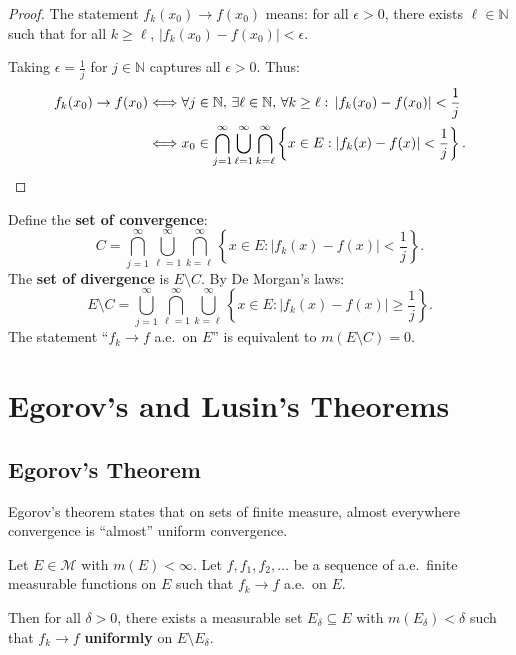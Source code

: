 \documentclass[11pt]{report}
\begin{document}
\begin{proof}
The statement $f_k(x_0) \to f(x_0)$ means: for all $\epsilon > 0$, there exists $\ell \in \mathbb{N}$ such that for all $k \geq \ell$, $|f_k(x_0) - f(x_0)| < \epsilon$.

Taking $\epsilon = \frac{1}{j}$ for $j \in \mathbb{N}$ captures all $\epsilon > 0$. Thus:
\begin{align*}
f_k(x_0) \to f(x_0) &\Longleftrightarrow \forall j \in \mathbb{N}, \, \exists \ell \in \mathbb{N}, \, \forall k \geq \ell: \, |f_k(x_0) - f(x_0)| < \frac{1}{j} \\
&\Longleftrightarrow x_0 \in \bigcap_{j=1}^{\infty} \bigcup_{\ell=1}^{\infty} \bigcap_{k=\ell}^{\infty} \left\{ x \in E : |f_k(x) - f(x)| < \frac{1}{j} \right\}. \qedhere
\end{align*}
\end{proof}

\begin{defbox}
Define the \textbf{set of convergence}:
\[
C = \bigcap_{j=1}^{\infty} \bigcup_{\ell=1}^{\infty} \bigcap_{k=\ell}^{\infty} \left\{ x \in E : |f_k(x) - f(x)| < \frac{1}{j} \right\}.
\]
The \textbf{set of divergence} is $E \setminus C$. By De Morgan's laws:
\[
E \setminus C = \bigcup_{j=1}^{\infty} \bigcap_{\ell=1}^{\infty} \bigcup_{k=\ell}^{\infty} \left\{ x \in E : |f_k(x) - f(x)| \geq \frac{1}{j} \right\}.
\]
The statement ``$f_k \to f$ a.e.\ on $E$'' is equivalent to $m(E \setminus C) = 0$.
\end{defbox}

\section{Egorov's and Lusin's Theorems}

\subsection{Egorov's Theorem}

Egorov's theorem states that on sets of finite measure, almost everywhere convergence is ``almost'' uniform convergence.

\begin{thmbox}
Let $E \in \mathcal{M}$ with $m(E) < \infty$. Let $f, f_1, f_2, \ldots$ be a sequence of a.e.\ finite measurable functions on $E$ such that $f_k \to f$ a.e.\ on $E$.

Then for all $\delta > 0$, there exists a measurable set $E_\delta \subseteq E$ with $m(E_\delta) < \delta$ such that $f_k \to f$ \textbf{uniformly} on $E \setminus E_\delta$.
\end{thmbox}
\end{document}
